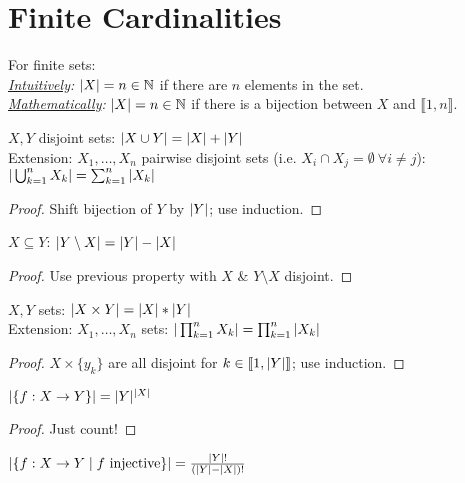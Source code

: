 \chapter{Finite Cardinalities}

\begin{definition}[Cardinality] For finite sets:\\
	\emph{\underline{Intuitively}:} $| X | = n \in \mathbb{N}$ if there are $n$ elements in the set.\\
	\emph{\underline{Mathematically}:} $| X | = n \in \mathbb{N}$ if there is a bijection between $X$ and $\llbracket 1,n \rrbracket$.
\end{definition}
\begin{property}
	$X,Y$ disjoint sets: $| X \cup Y | = | X | + | Y |$\\
	Extension: $X_1, \dots, X_n$ pairwise disjoint sets (i.e. $X_i \cap X_j = \emptyset \ \forall i \neq j$): $| \bigcup_{k=1}^n X_k | = \sum_{k=1}^{n} | X_k |$
\end{property}
\begin{proof}
	Shift bijection of $Y$ by $| Y |$; use induction.
\end{proof}
\begin{property}
	$X \subseteq Y$: $| Y \setminus X | = | Y | - | X |$
\end{property}
\begin{proof}
	Use previous property with $X$ \& $Y \setminus X$ disjoint.
\end{proof}
\begin{property}
	$X,Y$ sets: $| X \times Y | = | X | * | Y |$\\
	Extension: $X_1, \dots, X_n$ sets: $| \prod_{k=1}^n X_k | = \prod_{k=1}^{n} | X_k |$
\end{property}
\begin{proof}
	$X \times \{y_k\}$  are all disjoint for $k \in \llbracket 1,| Y | \rrbracket$; use induction.
\end{proof}
\begin{property}
	$|  \{f: X \to Y\}  | = | Y |^{| X |}$
\end{property}
\begin{proof}
	Just count!
\end{proof}
\begin{property}
	$|  \{f: X \to Y \mid f \text{ injective} \}  | = \frac{| Y |!}{(| Y |-| X |)!}$
\end{property}
